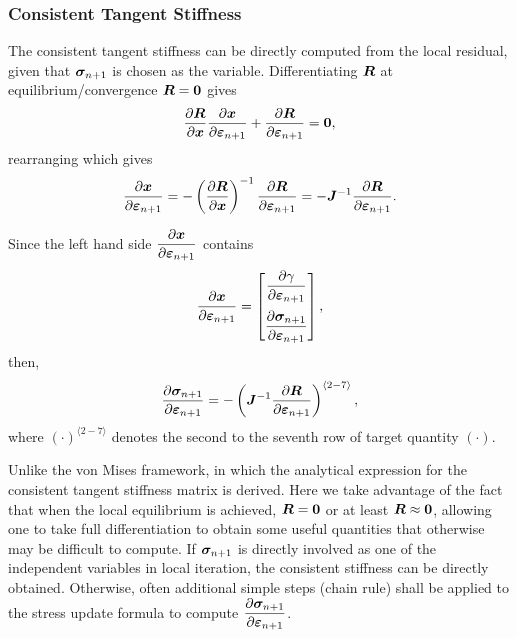 \subsubsection{Consistent Tangent Stiffness}
The consistent tangent stiffness can be directly computed from the local residual, given that $\bm{\sigma}_{n+1}$ is chosen as the variable. Differentiating $\bm{R}$ at equilibrium/convergence $\bm{R}=\bm{0}$ gives
\begin{gather}\label{eq:universal_consistent_tangent}
    \dfrac{\partial{\bm{R}}}{\partial{\bm{x}}}\dfrac{\partial{\bm{x}}}{\partial{\bm{\varepsilon}_{n+1}}}+\dfrac{\partial{\bm{R}}}{\partial{\bm{\varepsilon}_{n+1}}}=\bm{0},
\end{gather}
rearranging which gives
\begin{gather}
\dfrac{\partial{\bm{x}}}{\partial{\bm{\varepsilon}_{n+1}}}=-\left(\dfrac{\partial{\bm{R}}}{\partial{\bm{x}}}\right)^{-1}\dfrac{\partial{\bm{R}}}{\partial{\bm{\varepsilon}_{n+1}}}=-\bm{J}^{-1}\dfrac{\partial{\bm{R}}}{\partial{\bm{\varepsilon}_{n+1}}}.
\end{gather}

Since the left hand side $\dfrac{\partial{\bm{x}}}{\partial{\bm{\varepsilon}_{n+1}}}$ contains
\begin{gather}
    \dfrac{\partial{\bm{x}}}{\partial{\bm{\varepsilon}_{n+1}}}=\begin{bmatrix}
        \dfrac{\partial{\gamma}}{\partial{\bm{\varepsilon}_{n+1}}} \\[4mm]
        \dfrac{\partial{\bm{\sigma}_{n+1}}}{\partial{\bm{\varepsilon}_{n+1}}}
    \end{bmatrix},
\end{gather}
then,
\begin{gather}\label{eq:ortho_consistent_tangent}
\dfrac{\partial{\bm{\sigma}_{n+1}}}{\partial{\bm{\varepsilon}_{n+1}}}=-\left(\bm{J}^{-1}\dfrac{\partial{\bm{R}}}{\partial{\bm{\varepsilon}_{n+1}}}\right)^{\langle2-7\rangle},
\end{gather}
where $\left(\cdot\right)^{\langle2-7\rangle}$ denotes the second to the seventh row of target quantity $\left(\cdot\right)$.

Unlike the von Mises framework, in which the analytical expression for the consistent tangent stiffness matrix is derived. Here we take advantage of the fact that when the local equilibrium is achieved, $\bm{R}=\bm{0}$ or at least $\bm{R}\approx\bm{0}$, allowing one to take full differentiation to obtain some useful quantities that otherwise may be difficult to compute. If $\bm{\sigma}_{n+1}$ is directly involved as one of the independent variables in local iteration, the consistent stiffness can be directly obtained. Otherwise, often additional simple steps (chain rule) shall be applied to the stress update formula to compute $\dfrac{\partial{\bm{\sigma}_{n+1}}}{\partial{\bm{\varepsilon}_{n+1}}}$.

